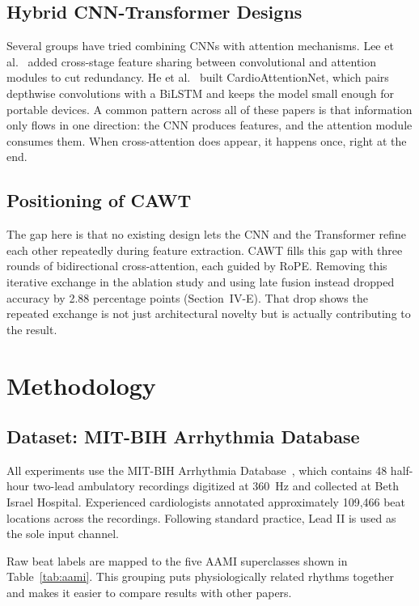 \documentclass[conference]{IEEEtran}
\begin{document}
\subsection{Hybrid CNN-Transformer Designs}
Several groups have tried combining CNNs with attention mechanisms. Lee et al.~\cite{lee2024} added cross-stage feature sharing between convolutional and attention modules to cut redundancy. He et al.~\cite{he2025} built CardioAttentionNet, which pairs depthwise convolutions with a BiLSTM and keeps the model small enough for portable devices. A common pattern across all of these papers is that information only flows in one direction: the CNN produces features, and the attention module consumes them. When cross-attention does appear, it happens once, right at the end.
 
\subsection{Positioning of CAWT}
The gap here is that no existing design lets the CNN and the Transformer refine each other repeatedly during feature extraction. CAWT fills this gap with three rounds of bidirectional cross-attention, each guided by RoPE. Removing this iterative exchange in the ablation study and using late fusion instead dropped accuracy by 2.88 percentage points (Section~IV-E). That drop shows the repeated exchange is not just architectural novelty but is actually contributing to the result.
 
\section{Methodology}
 
\subsection{Dataset: MIT-BIH Arrhythmia Database}
All experiments use the MIT-BIH Arrhythmia Database~\cite{moody2001, goldberger2000}, which contains 48 half-hour two-lead ambulatory recordings digitized at 360~Hz and collected at Beth Israel Hospital. Experienced cardiologists annotated approximately 109,466 beat locations across the recordings. Following standard practice, Lead II is used as the sole input channel.
 
Raw beat labels are mapped to the five AAMI superclasses shown in Table~\ref{tab:aami}. This grouping puts physiologically related rhythms together and makes it easier to compare results with other papers.
 
\end{document}
